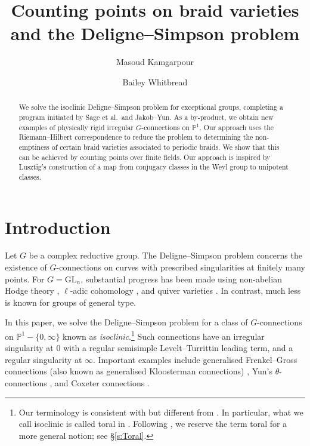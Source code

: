 \documentclass[11pt]{amsart}
\theoremstyle{definition}
\newcommand{\GL}{\mathrm{GL}}
\newcommand{\bP}{\mathbb{P}}
\begin{document}
\title{Counting points on braid varieties\\ and the Deligne--Simpson problem} 
\author{Masoud Kamgarpour}
\author{Bailey Whitbread}

\address{School of Mathematics and Physics, The University of Queensland, Australia}

\address{School of Mathematics and Statistics, The University of Sydney, Australia}


\begin{abstract} 
We solve the isoclinic Deligne–Simpson problem for exceptional groups, completing a program initiated by Sage et al.\ and Jakob--Yun. As a by-product, we obtain new examples of physically rigid irregular $G$-connections on $\bP^1$. Our approach uses the Riemann--Hilbert correspondence to reduce the problem to determining the non-emptiness of certain braid varieties associated to periodic braids. We show that this can be achieved by counting points over finite fields. Our approach is inspired by Lusztig's construction of a map from conjugacy classes in the Weyl group to unipotent  classes. 
\end{abstract} 

\maketitle 
\section{Introduction}  

Let $G$ be a complex reductive group. The Deligne--Simpson problem concerns the existence of $G$-connections on curves with prescribed singularities at finitely many points. For $G=\GL_n$, substantial progress has been made using non-abelian Hodge theory \cite{Simpson}, $\ell$-adic cohomology \cite{Katz}, and quiver varieties \cite{CB, Hiroe}. In contrast, much less is known for groups of general type.  

In this paper, we solve the Deligne--Simpson problem for a class of $G$-connections on $\bP^1-\{0,\infty\}$ known as \emph{isoclinic}.\footnote{Our terminology is consistent with \cite{JY} but different from \cite{SageReview}. In particular, what we call isoclinic is called toral in \cite{SageReview}. Following \cite{HJ}, we reserve the term toral for a more general notion; see \S \ref{s:Toral}.} Such connections have an irregular singularity at $0$ with a regular semisimple Levelt--Turrittin leading term, and a regular singularity at $\infty$. 
Important examples include generalised Frenkel--Gross connections (also known as generalised Kloosterman connections) \cite{FrenkelGross, HeinlothNgoYun}, Yun's $\theta$-connections \cite{YunEpipelagic, ChenRigid}, and Coxeter connections \cite{KS-rigid, KS-galois}.   
\end{document}

